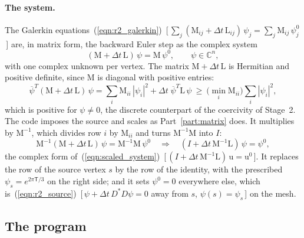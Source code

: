 \paragraph{The system.} The Galerkin equations~(\ref{eqn:r2_galerkin})~[\,$\sum_j(\mathrm M_{ij} + \Delta t\,\mathrm L_{ij})\,\psi_j = \sum_j\mathrm M_{ij}\,\psi^0_j$\,] are, in matrix form, the backward Euler step as the complex system
\begin{equation}
\label{eqn:ga_system}
(\mathrm M + \Delta t\, \mathrm L)\, \psi = \mathrm M\, \psi^0, \qquad \psi \in \mathbb C^n ,
\end{equation}
with one complex unknown per vertex. The matrix $\mathrm M + \Delta t\,\mathrm L$ is Hermitian and positive definite, since $\mathrm M$ is diagonal with positive entries:
\begin{equation*}
\overline\psi^T(\mathrm M + \Delta t\,\mathrm L)\,\psi = \sum_i \mathrm M_{ii}\,|\psi_i|^2 + \Delta t\;\overline\psi^T\mathrm L\,\psi \ \ge\ \Big(\min_i\mathrm M_{ii}\Big)\sum_i|\psi_i|^2 ,
\end{equation*}
which is positive for $\psi\ne 0$,
the discrete counterpart of the coercivity of Stage~2. The code imposes the source and scales as Part~\ref{part:matrix} does. It multiplies by $\mathrm M^{-1}$, which divides row $i$ by $\mathrm M_{ii}$ and turns $\mathrm M^{-1}\mathrm M$ into $I$:
\begin{equation*}
\mathrm M^{-1}(\mathrm M + \Delta t\,\mathrm L)\,\psi = \mathrm M^{-1}\mathrm M\,\psi^0 \quad\Longrightarrow\quad (I + \Delta t\,\mathrm M^{-1}\mathrm L)\,\psi = \psi^0 ,
\end{equation*}
the complex form of~(\ref{eqn:scaled_system})~[\,$(I + \Delta t\,\mathrm M^{-1}\mathrm L)\,\mathrm u = \mathrm u^0$\,]. It replaces the row of the source vertex $s$ by the row of the identity, with the prescribed $\psi_s = e^{2\pi\mathsf T/3}$ on the right side; and it sets $\psi^0 = 0$ everywhere else, which is~(\ref{eqn:r2_source})~[\,$\psi + \Delta t\, D^*D\psi = 0$ away from $s$, $\psi(s) = \psi_s$\,] on the mesh.

\subsection{The program}
\label{section:ga_code}

